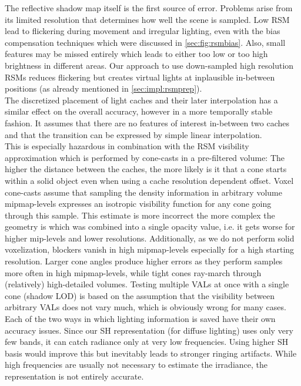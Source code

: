 \documentclass[thesis.tex]{subfiles}
\begin{document}
The reflective shadow map itself is the first source of error.
Problems arise from its limited resolution that determines how well the scene is sampled.
Low RSM lead to flickering during movement and irregular lighting, even with the bias compensation techniques which were discussed in \autoref{sec:fig:rsmbias}.
Also, small features may be missed entirely which leads to either too low or too high brightness in different areas.
Our approach to use down-sampled high resolution RSMs reduces flickering but creates virtual lights at inplausible in-between positions (as already mentioned in \autoref{sec:impl:rsmprep}).
\\
The discretized placement of light caches and their later interpolation has a similar effect on the overall accuracy, however in a more temporally stable fashion.
It assumes that there are no features of interest in-between two caches and that the transition can be expressed by simple linear interpolation.
\\
This is especially hazardous in combination with the RSM visibility approximation which is performed by cone-casts in a pre-filtered volume:
The higher the distance between the caches, the more likely is it that a cone starts within a solid object even when using a cache resolution dependent offset.
Voxel cone-casts assume that sampling the density information in arbitrary volume mipmap-levels expresses an isotropic visibility function for any cone going through this sample.
This estimate is more incorrect the more complex the geometry is which was combined into a single opacity value, i.e. it gets worse for higher mip-levels and lower resolutions.
Additionally, as we do not perform solid voxelization, blockers vanish in high mipmap-levels especially for a high starting resolution.
Larger cone angles produce higher errors as they perform samples more often in high mipmap-levels, while tight cones ray-march through (relatively) high-detailed volumes.
Testing multiple VALs at once with a single cone (shadow LOD) is based on the assumption that the visibility between arbitrary VALs does not vary much, which is obviously wrong for many cases.
\\
Each of the two ways in which lighting information is saved have their own accuracy issues.
Since our SH representation (for diffuse lighting) uses only very few bands, it can catch radiance only at very low frequencies.
Using higher SH basis would improve this but inevitably leads to stronger ringing artifacts.
While high frequencies are usually not necessary to estimate the irradiance, the representation is not entirely accurate.
\end{document}
